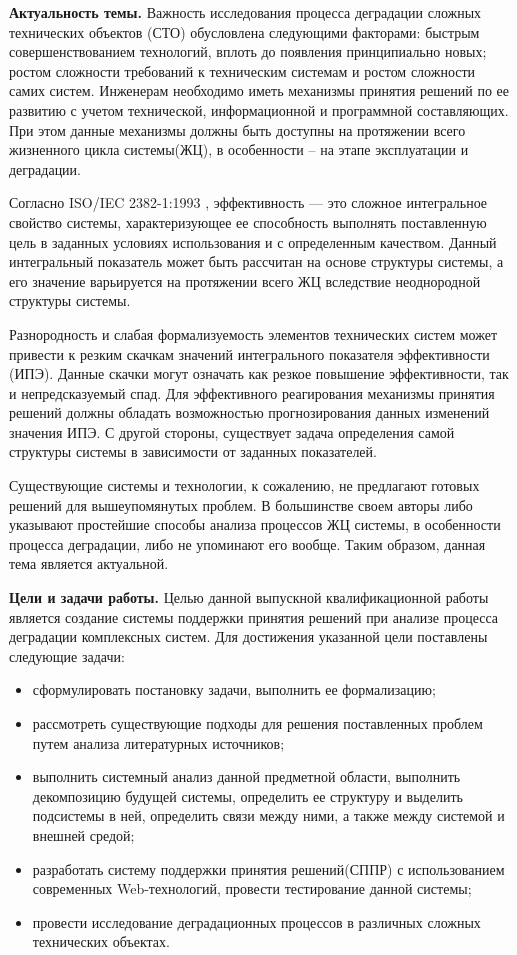 
\textbf{Актуальность темы.}
Важность исследования процесса деградации сложных технических объектов (СТО) обусловлена следующими факторами: 
быстрым совершенствованием технологий, вплоть до появления принципиально новых; ростом сложности требований к техническим системам и ростом сложности самих систем. 
Инженерам необходимо иметь механизмы принятия решений по ее развитию с учетом технической, информационной и программной составляющих.
При этом данные механизмы должны быть доступны на протяжении всего жизненного цикла системы(ЖЦ), в особенности – на этапе эксплуатации и деградации.

Согласно ISO/IEC 2382-1:1993 \cite{ISO}, эффективность — это сложное интегральное свойство системы, характеризующее ее способность выполнять поставленную цель в заданных условиях использования и с определенным качеством. 
Данный интегральный показатель может быть рассчитан на основе структуры системы, а его значение варьируется на протяжении всего ЖЦ вследствие неоднородной структуры системы. 

Разнородность и слабая формализуемость элементов технических систем может привести к резким скачкам значений интегрального показателя эффективности (ИПЭ). 
Данные скачки могут означать как резкое повышение эффективности, так и непредсказуемый спад. 
Для эффективного реагирования механизмы принятия решений должны обладать возможностью прогнозирования данных изменений значения ИПЭ. 
С другой стороны, существует задача определения самой структуры системы в зависимости от заданных показателей.

Существующие системы и технологии, к сожалению, не предлагают готовых решений для вышеупомянутых проблем.
В большинстве своем авторы либо указывают простейшие способы анализа процессов ЖЦ системы, в особенности процесса деградации, либо не упоминают его вообще. 
Таким образом, данная тема является актуальной.

\textbf{Цели и задачи работы.} 
Целью данной выпускной квалификационной работы является создание системы поддержки принятия решений при анализе процесса деградации комплексных систем.
Для достижения указанной цели поставлены следующие задачи: 
\begin{itemize}
  \item сформулировать постановку задачи, выполнить ее формализацию;
  \item рассмотреть существующие подходы для решения поставленных проблем путем анализа литературных источников;
  \item выполнить системный анализ данной предметной области, выполнить декомпозицию будущей системы, определить ее структуру и выделить подсистемы в ней, определить связи между ними, а также между системой и внешней средой;
  \item разработать систему поддержки принятия решений(СППР) с использованием современных Web-технологий, провести тестирование данной системы;
  \item провести исследование деградационных процессов в различных сложных технических объектах.
\end{itemize}

